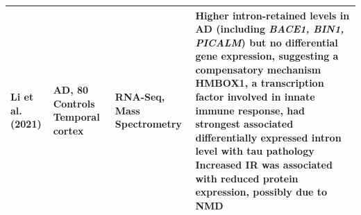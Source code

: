 \begin{changemargin}{1.5cm}
\begin{landscape}
\begin{longtable}[c]{p{3cm}p{4cm}p{3cm}p{16cm}}
			\centering Li et al. (2021) \cite{Li2021} &
			\centering 84 AD, 80 Controls \newline Temporal cortex &
			\centering RNA-Seq, Mass Spectrometry &
			\tabitem Higher intron-retained levels in AD (including \textit{BACE1, BIN1, PICALM}) but no differential gene expression, suggesting a compensatory mechanism \newline
			\tabitem HMBOX1, a transcription factor involved in innate immune response, had strongest associated differentially expressed intron level with tau pathology \newline
			\tabitem Increased IR was associated with reduced protein expression, possibly due to NMD \\* \bottomrule
		\end{longtable}
	\end{landscape}
\end{changemargin}

